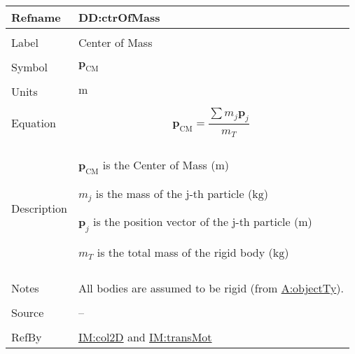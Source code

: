 \documentclass[12pt]{article}
\begin{document}
\vspace{\baselineskip}
\noindent
\begin{minipage}{\textwidth}
\begin{tabular}{>{\raggedright}p{}>{\raggedright\arraybackslash}p{}}
\toprule \textbf{Refname} & \textbf{DD:ctrOfMass}
\label{DD:ctrOfMass}
\\ \midrule \\
Label & Center of Mass
        
\\ \midrule \\
Symbol & ${\symbf{p}_{\text{CM}}}$
         
\\ \midrule \\
Units & ${\text{m}}$
        
\\ \midrule \\
Equation & \begin{displaymath}
           {\symbf{p}_{\text{CM}}}=\frac{\displaystyle\sum{{m_{j}} {\symbf{p}_{j}}}}{{m_{T}}}
           \end{displaymath}
\\ \midrule \\
Description & \begin{symbDescription}
              \item{${\symbf{p}_{\text{CM}}}$ is the Center of Mass (${\text{m}}$)}
              \item{${m_{j}}$ is the mass of the j-th particle (${\text{kg}}$)}
              \item{${\symbf{p}_{j}}$ is the position vector of the j-th particle (${\text{m}}$)}
              \item{${m_{T}}$ is the total mass of the rigid body (${\text{kg}}$)}
              \end{symbDescription}
\\ \midrule \\
Notes & All bodies are assumed to be rigid (from \hyperref[assumpOT]{A:objectTy}).
        
\\ \midrule \\
Source & --
         
\\ \midrule \\
RefBy & \hyperref[IM:col2D]{IM:col2D} and \hyperref[IM:transMot]{IM:transMot}
        
\\ \bottomrule
\end{tabular}
\end{minipage}
\end{document}
